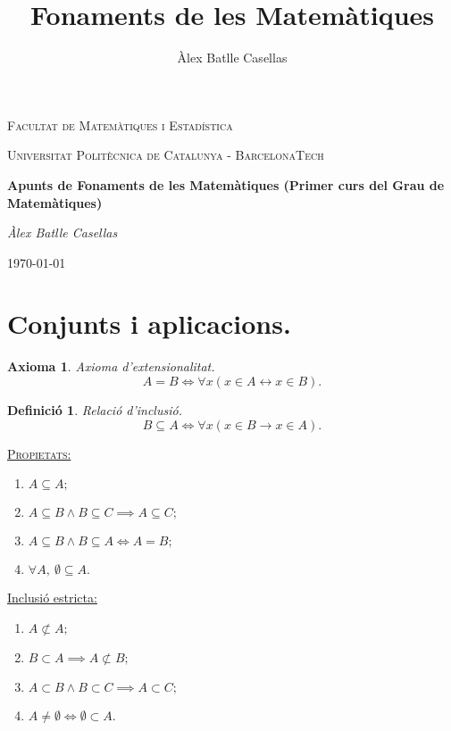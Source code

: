 \documentclass[11pt]{article}
\title{Fonaments de les Matemàtiques}
\author{Àlex Batlle Casellas}
\newcommand{\propietats}{\underline{{\scshape Propietats:}}}
\newtheorem{defi}{Definició}[section]
\newtheorem{ax}{Axioma}[section]
\begin{document}
\begin{titlepage}
	\centering
	{\scshape\LARGE Facultat de Matemàtiques i Estadística \par}
	\vspace{1cm}
	{\scshape\Large Universitat Politècnica de Catalunya - BarcelonaTech\par}
	\vspace{1.5cm}
	{\huge\bfseries Apunts de Fonaments de les Matemàtiques (Primer curs del Grau de Matemàtiques)
	\par}
	\vspace{2cm}
	{\Large\itshape Àlex Batlle Casellas\par}

	\vfill

	{\large \today\par}
\end{titlepage}


\vfill
\newpage

\tableofcontents

\newpage

\setcounter{section}{1}

\section{Conjunts i aplicacions.}
\begin{ax}
Axioma d'extensionalitat. $$A=B\iff\forall x(x\in A \leftrightarrow x\in B).$$
\end{ax}
\begin{defi}
Relació d'inclusió.
$$B\subseteq A\iff \forall x(x\in B\rightarrow x\in A).$$
\end{defi}
\noindent\propietats
\begin{enumerate}
	\item $A\subseteq A;$
	\item $A\subseteq B\wedge B\subseteq C\implies A\subseteq C;$
	\item $A\subseteq B\wedge B\subseteq A \iff A=B;$
	\item $\forall A, \ \emptyset\subseteq A.$
\end{enumerate}
\underline{Inclusió estricta:}
\begin{enumerate}
	\item $A\not\subset A;$
	\item $B\subset A\implies A\not\subset B;$
	\item $A\subset B\wedge B\subset C\implies A\subset C;$
	\item $A\neq\emptyset\iff\emptyset\subset A.$
\end{enumerate}
\end{document}
